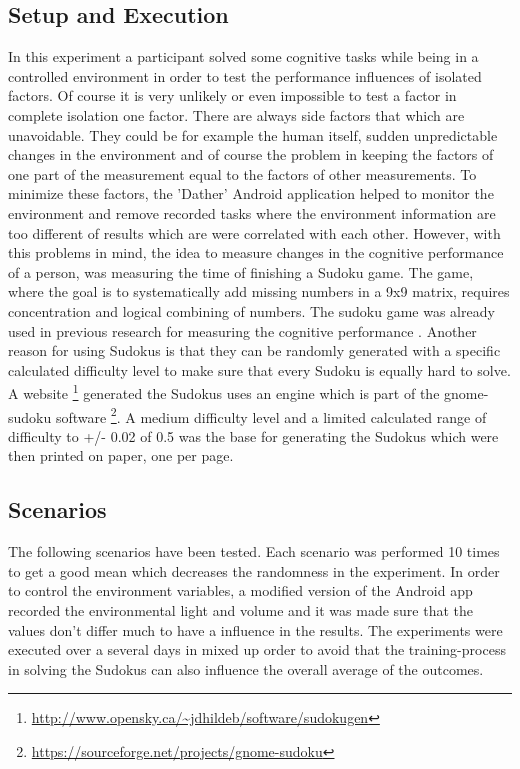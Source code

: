 \subsection{Setup and Execution}
In this experiment a participant solved some cognitive tasks while being in a controlled environment in order to test the performance influences of isolated factors. 
Of course it is very unlikely or even impossible to test a factor in complete isolation one factor. There are always side factors that which are unavoidable. They could be for example the human itself, sudden unpredictable changes in the environment and of course the problem in keeping the factors of one part of the measurement equal to the factors of other measurements. 
To minimize these factors, the 'Dather' Android application helped to monitor the environment and remove recorded tasks where the environment information are too different of results which are were correlated with each other. 
However, with this problems in mind, the idea to measure changes in the cognitive performance of a person, was measuring the time of finishing a Sudoku game. 
The game, where the goal is to systematically add missing numbers in a 9x9 matrix, requires concentration and logical combining of numbers. 
The sudoku game was already used in previous research for measuring the cognitive performance \cite{sobolewski2009monitoring} \cite{xiang2009using}. 
Another reason for using Sudokus is that they can be randomly generated with a specific calculated difficulty level to make sure that every Sudoku is equally hard to solve. 
A website \footnote{\url{http://www.opensky.ca/~jdhildeb/software/sudokugen}} generated the Sudokus uses an engine which is part of the gnome-sudoku software \footnote{\url{https://sourceforge.net/projects/gnome-sudoku}}. 
A medium difficulty level and a limited calculated range of difficulty to +/- 0.02 of 0.5 was the base for generating the Sudokus which were then printed on paper, one per page. 

\subsection{Scenarios}
The following scenarios have been tested. Each scenario was performed 10 times to get a good mean which decreases the randomness in the experiment. In order to control the environment variables, a modified version of the Android app recorded the environmental light and volume and it was made sure that the values don't differ much to have a influence in the results. 
The experiments were executed over a several days in mixed up order to avoid that the training-process in solving the Sudokus can also influence the overall average of the outcomes.

